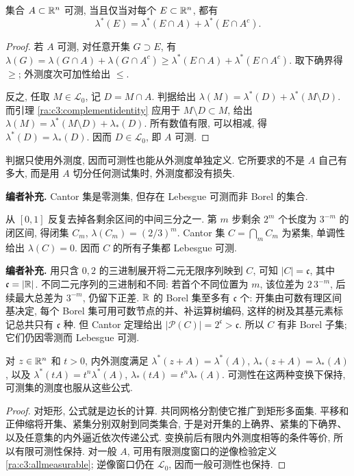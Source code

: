 \begin{theorem}\label{ra:c3:caratheodory}
集合 $A\subset\mathbb R^n$ 可测, 当且仅当对每个 $E\subset\mathbb R^n$, 都有
\[
 \lambda^*(E)=\lambda^*(E\cap A)+\lambda^*(E\cap A^c).
\]
\end{theorem}
\begin{proof}
若 $A$ 可测, 对任意开集 $G\supset E$, 有 $\lambda(G)=\lambda(G\cap A)+\lambda(G\cap A^c)\ge\lambda^*(E\cap A)+\lambda^*(E\cap A^c)$. 取下确界得 $\ge$; 外测度次可加性给出 $\le$.

反之, 任取 $M\in\mathcal L_0$, 记 $D=M\cap A$. 判据给出 $\lambda(M)=\lambda^*(D)+\lambda^*(M\setminus D)$. 而引理 \ref{ra:c3:complementidentity} 应用于 $M\setminus D\subset M$, 给出 $\lambda(M)=\lambda^*(M\setminus D)+\lambda_*(D)$. 所有数值有限, 可以相减, 得 $\lambda^*(D)=\lambda_*(D)$. 因而 $D\in\mathcal L_0$, 即 $A$ 可测.
\end{proof}

判据只使用外测度, 因而可测性也能从外测度单独定义. 它所要求的不是 $A$ 自己有多大, 而是用 $A$ 切分任何测试集时, 外测度都没有损失.

\begin{example}\label{ra:c3:cantor}
\textbf{编者补充.} Cantor 集是零测集, 但存在 Lebesgue 可测而非 Borel 的集合.
\end{example}
\begin{solution}
从 $[0,1]$ 反复去掉各剩余区间的中间三分之一. 第 $m$ 步剩余 $2^m$ 个长度为 $3^{-m}$ 的闭区间, 得闭集 $C_m$, $\lambda(C_m)=(2/3)^m$. Cantor 集 $C=\bigcap_mC_m$ 为紧集, 单调性给出 $\lambda(C)=0$. 因而 $C$ 的所有子集都 Lebesgue 可测.

\textbf{编者补充.} 用只含 $0,2$ 的三进制展开将二元无限序列映到 $C$, 可知 $|C|=\mathfrak c$, 其中 $\mathfrak c=|\mathbb R|$. 不同二元序列的三进制和不同: 若首个不同位置为 $m$, 该位差为 $2\,3^{-m}$, 后续最大总差为 $3^{-m}$, 仍留下正差. $\mathbb R$ 的 Borel 集至多有 $\mathfrak c$ 个: 开集由可数有理区间基决定, 每个 Borel 集可用可数节点的并、补运算树编码, 这样的树及其基元素标记总共只有 $\mathfrak c$ 种. 但 Cantor 定理给出 $|\mathcal P(C)|=2^{\mathfrak c}>\mathfrak c$. 所以 $C$ 有非 Borel 子集; 它们仍因零测而 Lebesgue 可测.
\end{solution}


\begin{proposition}\label{ra:c3:translations}
对 $z\in\mathbb R^n$ 和 $t>0$, 内外测度满足 $\lambda^*(z+A)=\lambda^*(A)$, $\lambda_*(z+A)=\lambda_*(A)$, 以及 $\lambda^*(tA)=t^n\lambda^*(A)$, $\lambda_*(tA)=t^n\lambda_*(A)$. 可测性在这两种变换下保持, 可测集的测度也服从这些公式.
\end{proposition}
\begin{proof}
对矩形, 公式就是边长的计算. 共同网格分割使它推广到矩形多面集. 平移和正伸缩将开集、紧集分别双射到同类集合, 于是对开集的上确界、紧集的下确界、以及任意集的内外逼近依次传递公式. 变换前后有限内外测度相等的条件等价, 所以有限可测性保持. 对一般 $A$, 可用有限测度窗口的逆像检验定义 \ref{ra:c3:allmeasurable}; 逆像窗口仍在 $\mathcal L_0$, 因而一般可测性也保持.
\end{proof}

